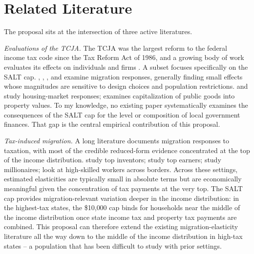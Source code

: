 \documentclass[12pt]{article}
\begin{document}
\section{Related Literature}

The proposal sits at the intersection of three active literatures.

\textit{Evaluations of the TCJA.} The TCJA was the largest reform to the federal income tax code since the Tax Reform Act of 1986, and a growing body of work evaluates its effects on individuals and firms \citep{Chodorow-ReichSmithZidarZwick2025, KennedyDobridgeLandefeldMortenson2025, Chodorow-ReichZidarZwick2024}. A subset focuses specifically on the SALT cap. \cite{drukker}, \cite{YoungLurie2025}, \cite{Coen-PiraniSieg2019}, and \cite{BruceKessler2022} examine migration responses, generally finding small effects whose magnitudes are sensitive to design choices and population restrictions. \cite{Horton2023} and \cite{LiYu2022} study housing-market responses; \cite{AmbroseValentin2025} examines capitalization of public goods into property values. To my knowledge, no existing paper systematically examines the consequences of the SALT cap for the level or composition of local government finances. That gap is the central empirical contribution of this proposal.

\textit{Tax-induced migration.} A long literature documents migration responses to taxation, with most of the credible reduced-form evidence concentrated at the top of the income distribution. \cite{AkcigitBaslandzeStantcheva2016} study top inventors; \cite{KlevenLandaisMunozStantcheva} study top earners; \cite{YoungVarnerLuriePrisinzano2016} study millionaires; \cite{LiebigPuhaniSousa-Poza2007} look at high-skilled workers across borders. Across these settings, estimated elasticities are typically small in absolute terms but are economically meaningful given the concentration of tax payments at the very top. The SALT cap provides migration-relevant variation deeper in the income distribution: in the highest-tax states, the \$10{,}000 cap binds for households near the middle of the income distribution once state income tax and property tax payments are combined. This proposal can therefore extend the existing migration-elasticity literature all the way down to the middle of the income distribution in high-tax states -- a population that has been difficult to study with prior settings.
\end{document}
